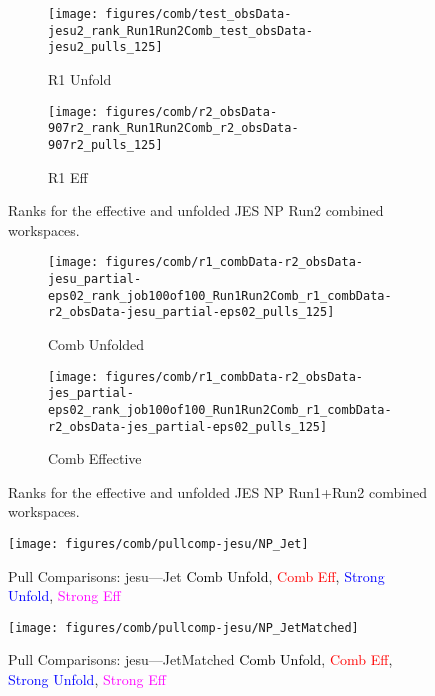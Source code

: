 \begin{figure}[!htbp]\captionsetup{justification=centering}
  \centering
\begin{subfigure}[t]{0.45000\textwidth}\centering\texttt{[image: figures/comb/test\_obsData-jesu2\_rank\_Run1Run2Comb\_test\_obsData-jesu2\_pulls\_125]}\caption{R1 Unfold}\end{subfigure}
\begin{subfigure}[t]{0.45000\textwidth}\centering\texttt{[image: figures/comb/r2\_obsData-907r2\_rank\_Run1Run2Comb\_r2\_obsData-907r2\_pulls\_125]}\caption{R1 Eff}\end{subfigure}
  \caption{Ranks for the effective and unfolded JES NP Run2 combined workspaces.}
    \label{fig:Ranks:jesu2}
\end{figure}

\begin{figure}[!htbp]\captionsetup{justification=centering}
  \centering
\begin{subfigure}[t]{0.45\textwidth}\centering\texttt{[image: figures/comb/r1\_combData-r2\_obsData-jesu\_partial-eps02\_rank\_job100of100\_Run1Run2Comb\_r1\_combData-r2\_obsData-jesu\_partial-eps02\_pulls\_125]}\caption{Comb Unfolded}\end{subfigure}
\begin{subfigure}[t]{0.45\textwidth}\centering\texttt{[image: figures/comb/r1\_combData-r2\_obsData-jes\_partial-eps02\_rank\_job100of100\_Run1Run2Comb\_r1\_combData-r2\_obsData-jes\_partial-eps02\_pulls\_125]}\caption{Comb Effective}\end{subfigure}
  \caption{Ranks for the effective and unfolded JES NP Run1+Run2 combined workspaces.}
    \label{fig:Ranks:jesuc}
\end{figure}

\begin{figure}[!htbp]\captionsetup{justification=centering}
\centering
\texttt{[image: figures/comb/pullcomp-jesu/NP\_Jet]}
  \caption{Pull Comparisons: jesu---Jet  \textcolor{black}{Comb Unfold}, \textcolor{red}{Comb Eff}, \textcolor{blue}{Strong Unfold}, \textcolor{magenta}{Strong Eff}}
  \label{fig:PullComparisons:jesu---Jet}  
\end{figure}

\begin{figure}[!htbp]\captionsetup{justification=centering}
\centering
\texttt{[image: figures/comb/pullcomp-jesu/NP\_JetMatched]}
  \caption{Pull Comparisons: jesu---JetMatched  \textcolor{black}{Comb Unfold}, \textcolor{red}{Comb Eff}, \textcolor{blue}{Strong Unfold}, \textcolor{magenta}{Strong Eff}}
  \label{fig:PullComparisons:jesu---JetMatched}
\end{figure}

